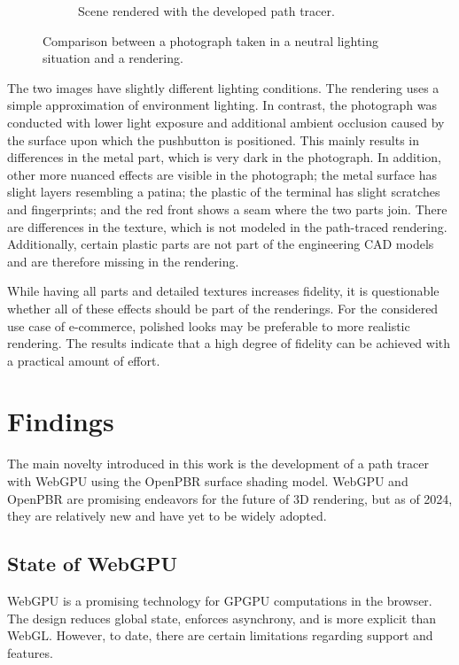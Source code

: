 \begin{figure}[H]
\begin{subfigure}[t]{0.45\textwidth}
    \caption{Scene rendered with the developed path tracer.}
    \label{fig:real-rendering}
  \end{subfigure}
  \hspace*{0.2cm}
  \caption{Comparison between a photograph taken in a neutral lighting situation and a rendering.}
  \label{fig:real-rendering-comparison}
\end{figure}

The two images have slightly different lighting conditions. The rendering uses a simple approximation of environment lighting. In contrast, the photograph was conducted with lower light exposure and additional ambient occlusion caused by the surface upon which the pushbutton is positioned. This mainly results in differences in the metal part, which is very dark in the photograph. In addition, other more nuanced effects are visible in the photograph; the metal surface has slight layers resembling a patina; the plastic of the terminal has slight scratches and fingerprints; and the red front shows a seam where the two parts join. There are differences in the texture, which is not modeled in the path-traced rendering. Additionally, certain plastic parts are not part of the engineering \gls{CAD} models and are therefore missing in the rendering.

While having all parts and detailed textures increases fidelity, it is questionable whether all of these effects should be part of the renderings. For the considered use case of e-commerce, polished looks may be preferable to more realistic rendering. The results indicate that a high degree of fidelity can be achieved with a practical amount of effort.

\newpage

\section{Findings}

The main novelty introduced in this work is the development of a path tracer with \gls{WebGPU} using the \gls{OpenPBR} surface shading model. \gls{WebGPU} and \gls{OpenPBR} are promising endeavors for the future of 3D rendering, but as of 2024, they are relatively new and have yet to be widely adopted.

\subsection*{State of WebGPU}

\gls{WebGPU} is a promising technology for \gls{GPGPU} computations in the browser. The design reduces global state, enforces asynchrony, and is more explicit than \gls{WebGL}. However, to date, there are certain limitations regarding support and features.

